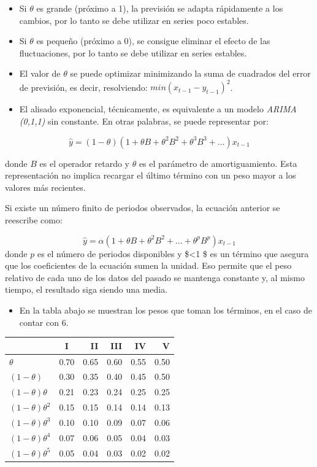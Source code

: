\documentclass[]{book}
\providecommand{\tightlist}{%
  \setlength{\itemsep}{0pt}\setlength{\parskip}{0pt}}
\begin{document}
\begin{itemize}
\tightlist
\item
  Si \(\theta\) es grande (próximo a 1), la previsión se adapta rápidamente a los cambios, por lo tanto se debe utilizar en series poco estables.
\item
  Si \(\theta\) es pequeño (próximo a 0), se consigue eliminar el efecto de las fluctuaciones, por lo tanto se debe utilizar en series estables.
\item
  El valor de \(\theta\) se puede optimizar minimizando la suma de cuadrados del error de previsión, es decir, resolviendo: \(min(x_{t-1} - y_{t-1})^2\).
\item
  El alisado exponencial, técnicamente, es equivalente a un modelo \emph{ARIMA (0,1,1)} sin constante. En otras palabras, se puede representar por:
\end{itemize}

\[\hat{y} = (1-\theta)(1 + \theta B + \theta^2 B^2 + \theta^3 B^3 + ...)x_{t-1}\]

donde \(B\) es el operador retardo y \(\theta\) es el parámetro de amortiguamiento. Esta representación no implica recargar el último término con un peso mayor a los valores más recientes.

Si existe un número finito de periodos observados, la ecuación anterior se reescribe como:

\[ \hat{y} = \alpha (1 + \theta B + \theta^2 B^2 + ... + \theta^p B^p)x_{t-1}\]
donde \(p\) es el número de periodos disponibles y \$\alpha \textless{}1 \$ es un término que asegura que los coeficientes de la ecuación sumen la unidad. Eso permite que el peso relativo de cada uno de los datos del pasado se mantenga constante y, al mismo tiempo, el resultado siga siendo una media.

\begin{itemize}
\tightlist
\item
  En la tabla abajo se muestran los pesos que toman los términos, en el caso de contar con 6.
\end{itemize}

\begin{longtable}[]{@{}lcrrrr@{}}
\toprule
& I & II & III & IV & V\tabularnewline
\midrule
\endhead
\(\theta\) & 0.70 & 0.65 & 0.60 & 0.55 & 0.50\tabularnewline
\((1- \theta)\) & 0.30 & 0.35 & 0.40 & 0.45 & 0.50\tabularnewline
\((1- \theta)\theta\) & 0.21 & 0.23 & 0.24 & 0.25 & 0.25\tabularnewline
\((1- \theta)\theta^2\) & 0.15 & 0.15 & 0.14 & 0.14 & 0.13\tabularnewline
\((1- \theta)\theta^3\) & 0.10 & 0.10 & 0.09 & 0.07 & 0.06\tabularnewline
\((1- \theta)\theta^4\) & 0.07 & 0.06 & 0.05 & 0.04 & 0.03\tabularnewline
\((1- \theta)\theta^5\) & 0.05 & 0.04 & 0.03 & 0.02 & 0.02\tabularnewline
\bottomrule
\end{longtable}
\end{document}
